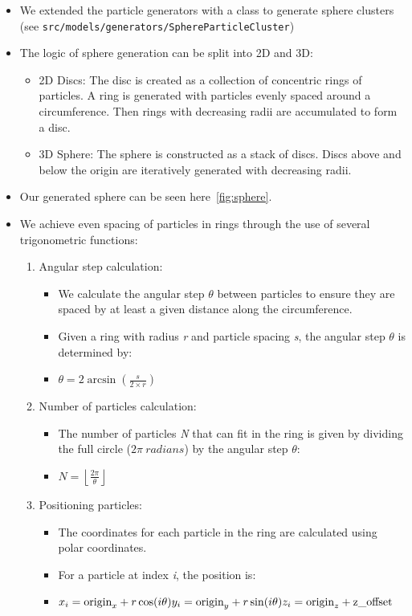 \documentclass{article}
\begin{document}
\begin{itemize}
    \item We extended the particle generators with a class to generate sphere clusters (see \texttt{src/models/generators/SphereParticleCluster})
    \item The logic of sphere generation can be split into 2D and 3D:
    \begin{itemize}
        \item 2D Discs: The disc is created as a collection of concentric rings of particles. A ring is generated with particles evenly spaced around a circumference. Then rings with decreasing radii are accumulated to form a disc.
        \item 3D Sphere: The sphere is constructed as a stack of discs. Discs above and below the origin are iteratively generated with decreasing radii.
    \end{itemize}
    \item Our generated sphere can be seen here\ \ref{fig:sphere}.
    \item We achieve even spacing of particles in rings through the use of several trigonometric functions:
    \begin{enumerate}
        \item Angular step calculation:
        \begin{itemize}
            \item We calculate the angular step $\theta$ between particles to ensure they are spaced by at least a given distance along the circumference.
            \item Given a ring with radius \textit{r} and particle spacing \textit{s}, the angular step $\theta$ is determined by:
            \item $\theta = 2 \arcsin\left(\frac{s}{2 \times r}\right)$
        \end{itemize}
        \item Number of particles calculation:
        \begin{itemize}
            \item The number of particles \textit{N} that can fit in the ring is given by dividing the full circle ($2\pi\ radians$) by the angular step $\theta$:
            \item $N = \left\lfloor \frac{2\pi}{\theta} \right\rfloor$
        \end{itemize}
        \item Positioning particles:
        \begin{itemize}
            \item The coordinates for each particle in the ring are calculated using polar coordinates.
            \item For a particle at index \textit{i}, the position is:
            \item $x_i = \text{origin}_x + r \cos(i \theta)\newline y_i = \text{origin}_y + r \sin(i \theta)\newline z_i = \text{origin}_z + \text{z\_offset}$
        \end{itemize}
    \end{enumerate}
\end{itemize}
\end{document}
